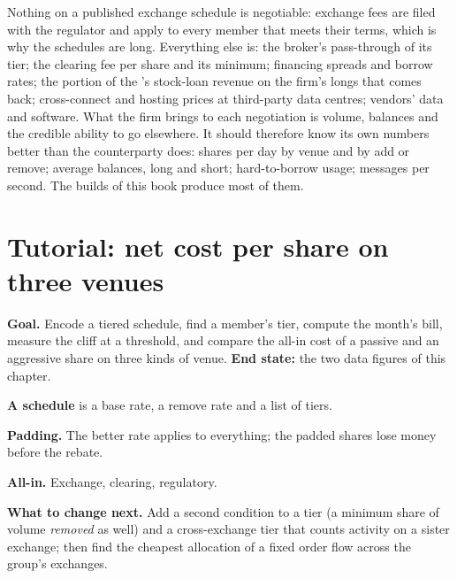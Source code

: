 Nothing on a published exchange schedule is negotiable: exchange fees are
filed with the regulator and apply to every member that meets their terms,
which is why the schedules are long. Everything else is: the broker's pass-through of its tier; the
clearing fee per share and its minimum; financing spreads and borrow rates;
the portion of the 's stock-loan revenue on the firm's longs
that comes back; cross-connect and hosting prices at third-party data
centres; vendors' data and software. What the firm brings to each
negotiation is volume, balances and the credible ability to go elsewhere. It
should therefore know its own numbers better than the counterparty does:
shares per day by venue and by add or remove; average balances, long and
short; hard-to-borrow usage; messages per second. The builds of this book
produce most of them.

\section{Tutorial: net cost per share on three venues}\label{tut:m1:getting-access-equities:cost}

\begin{tutorial}
\textbf{Goal.} Encode a tiered schedule, find a member's tier, compute the
month's bill, measure the cliff at a threshold, and compare the all-in cost
of a passive and an aggressive share on three kinds of venue. \textbf{End
state:} the two data figures of this chapter.
\begin{tutsteps}
\item \textbf{A schedule} is a base rate, a remove rate and a list of tiers.
\label{lst:m1:getting-access-equities:schedule}
\item \textbf{Padding.} The better rate applies to everything; the padded
shares lose money before the rebate.
\label{lst:m1:getting-access-equities:padding}
\item \textbf{All-in.} Exchange, clearing, regulatory.
\end{tutsteps}
\textbf{What to change next.} Add a second condition to a tier (a minimum
share of volume \emph{removed} as well) and a cross-exchange tier that counts
activity on a sister exchange; then find the cheapest allocation of a fixed
order flow across the group's exchanges.
\end{tutorial}

